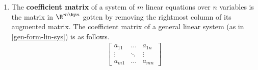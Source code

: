 \begin{enumerate}
  \textit{Examples.}
  \begin{itemize}
  \item
    The following matrix in $\R^{2 \by 3}$ is the augmented matrix of
    the linear system in \ref{lin-sys-ex-1}.
    \begin{displaymath}
      \begin{bmatrix}
        2 & 3 & 4 \\
        -5 & 3 & 0
      \end{bmatrix}
    \end{displaymath}
  \item
    The following matrix in $\R^{3 \by 5}$ is the augmented matrix of
    the linear system in \ref{lin-sys-ex-2}.
    \begin{displaymath}
      \begin{bmatrix}
        3 & -4.4 & 0 & 0 & 1 \\
        200 & 200 & 1 & 200 & 200 \\
        9 & -1 & 0 & -5 & 98
      \end{bmatrix}
    \end{displaymath}
  \end{itemize}
\item The \textbf{coefficient matrix} of a system of $m$ linear
  equations over $n$ variables is the matrix in $\R^{m \by n}$ gotten
  by removing the rightmost column of its augmented matrix.  The
  coefficient matrix of a general linear system (as in
  \ref{gen-form-lin-sys}) is as follows.
  \begin{align*}
    \begin{bmatrix}
      a_{11} & \dots & a_{1n} \\
      \vdots & \ddots & \vdots \\
      a_{m1} & \dots & a_{mn}
    \end{bmatrix}
  \end{align*}


\end{enumerate}
